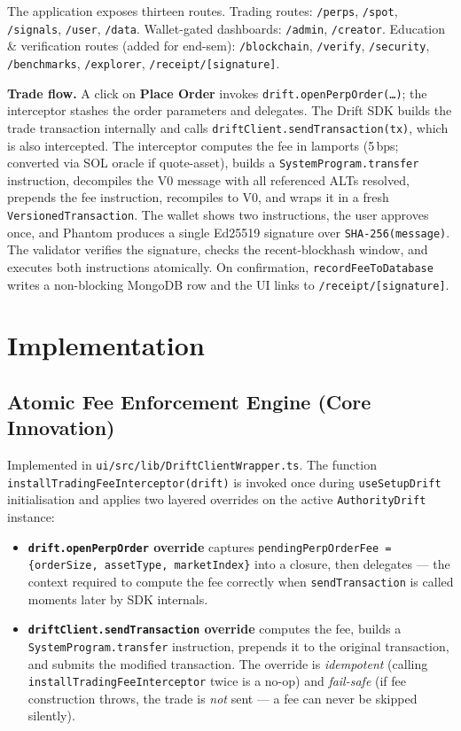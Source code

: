 \documentclass[11pt,a4paper]{article}
\begin{document}
The application exposes thirteen routes. Trading routes: \texttt{/perps}, \texttt{/spot}, \texttt{/signals}, \texttt{/user}, \texttt{/data}. Wallet-gated dashboards: \texttt{/admin}, \texttt{/creator}. Education \& verification routes (added for end-sem): \texttt{/blockchain}, \texttt{/verify}, \texttt{/security}, \texttt{/benchmarks}, \texttt{/explorer}, \texttt{/receipt/[signature]}.

\textbf{Trade flow.} A click on \textbf{Place Order} invokes \texttt{drift.openPerpOrder(\ldots)}; the interceptor stashes the order parameters and delegates. The Drift SDK builds the trade transaction internally and calls \texttt{driftClient.sendTransaction(tx)}, which is also intercepted. The interceptor computes the fee in lamports (5\,bps; converted via SOL oracle if quote-asset), builds a \texttt{SystemProgram.transfer} instruction, decompiles the V0 message with all referenced ALTs resolved, prepends the fee instruction, recompiles to V0, and wraps it in a fresh \texttt{VersionedTransaction}. The wallet shows two instructions, the user approves once, and Phantom produces a single Ed25519 signature over \texttt{SHA-256(message)}. The validator verifies the signature, checks the recent-blockhash window, and executes both instructions atomically. On confirmation, \texttt{recordFeeToDatabase} writes a non-blocking MongoDB row and the UI links to \texttt{/receipt/[signature]}.

\section{Implementation}

\subsection{Atomic Fee Enforcement Engine (Core Innovation)}

Implemented in \texttt{ui/src/lib/DriftClientWrapper.ts}. The function \texttt{installTradingFeeInterceptor(drift)} is invoked once during \texttt{useSetupDrift} initialisation and applies two layered overrides on the active \texttt{AuthorityDrift} instance:

\begin{itemize}
    \item \textbf{\texttt{drift.openPerpOrder} override} captures \texttt{pendingPerpOrderFee = \{orderSize, assetType, marketIndex\}} into a closure, then delegates --- the context required to compute the fee correctly when \texttt{sendTransaction} is called moments later by SDK internals.
    \item \textbf{\texttt{driftClient.sendTransaction} override} computes the fee, builds a \texttt{SystemProgram.transfer} instruction, prepends it to the original transaction, and submits the modified transaction. The override is \textit{idempotent} (calling \texttt{installTradingFeeInterceptor} twice is a no-op) and \textit{fail-safe} (if fee construction throws, the trade is \textit{not} sent --- a fee can never be skipped silently).
\end{itemize}
\end{document}

